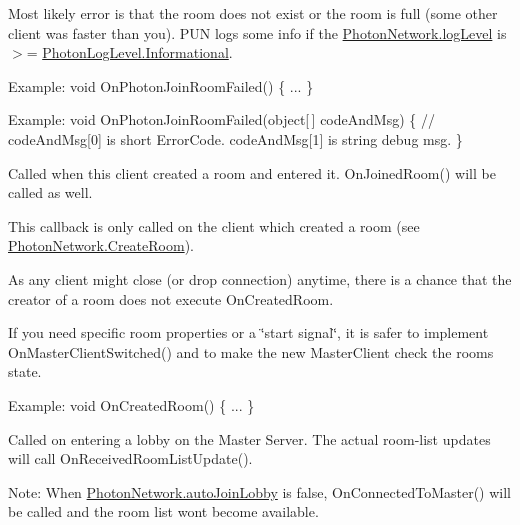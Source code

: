 \begin{Desc}
\begin{description}
Most likely error is that the room does not exist or the room is full (some other client was faster than you). P\+UN logs some info if the \hyperlink{class_photon_network_aa7c0c32ec0a25f37438436f10c5bde59}{Photon\+Network.\+log\+Level} is $>$= \hyperlink{group__public_api_ggaf0468f6a0c8ab8caec09678e6dc6f3d5a5391f9a882a54c787b206138ed6d28b0}{Photon\+Log\+Level.\+Informational}.

Example\+: void On\+Photon\+Join\+Room\+Failed() \{ ... \}

Example\+: void On\+Photon\+Join\+Room\+Failed(object\mbox{[}$\,$\mbox{]} code\+And\+Msg) \{ // code\+And\+Msg\mbox{[}0\mbox{]} is short Error\+Code. code\+And\+Msg\mbox{[}1\mbox{]} is string debug msg. \} \item[{\em 
On\+Created\+Room\hypertarget{group__public_api_ggaf30bbea51cc8c4b1ddc239d1c5c1468fa2959bccbe2dabb6a8d2024ea241f6f2f}{}\label{group__public_api_ggaf30bbea51cc8c4b1ddc239d1c5c1468fa2959bccbe2dabb6a8d2024ea241f6f2f}
}]Called when this client created a room and entered it. On\+Joined\+Room() will be called as well. 

This callback is only called on the client which created a room (see \hyperlink{class_photon_network_a5ab80136622c2ae46b0e4f766e489d74}{Photon\+Network.\+Create\+Room}).

As any client might close (or drop connection) anytime, there is a chance that the creator of a room does not execute On\+Created\+Room.

If you need specific room properties or a \char`\"{}start signal\char`\"{}, it is safer to implement On\+Master\+Client\+Switched() and to make the new Master\+Client check the room\textquotesingle{}s state.

Example\+: void On\+Created\+Room() \{ ... \} \item[{\em 
On\+Joined\+Lobby\hypertarget{group__public_api_ggaf30bbea51cc8c4b1ddc239d1c5c1468fa2af1a9ab5a169e8800132c0625d3c6b2}{}\label{group__public_api_ggaf30bbea51cc8c4b1ddc239d1c5c1468fa2af1a9ab5a169e8800132c0625d3c6b2}
}]Called on entering a lobby on the Master Server. The actual room-\/list updates will call On\+Received\+Room\+List\+Update(). 

Note\+: When \hyperlink{class_photon_network_ad534d4da7222bd8a6d8423cbd238d7f4}{Photon\+Network.\+auto\+Join\+Lobby} is false, On\+Connected\+To\+Master() will be called and the room list won\textquotesingle{}t become available.


\end{description}
\end{Desc}
